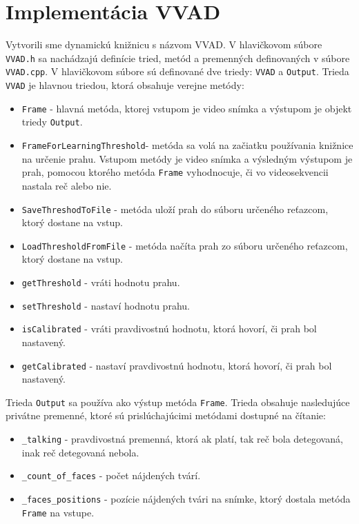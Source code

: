 \section{Implementácia VVAD}
Vytvorili sme dynamickú knižnicu s názvom VVAD. 
V hlavičkovom súbore \texttt{VVAD.h} sa nachádzajú definície tried, metód a premenných definovaných v súbore \texttt{VVAD.cpp}.
V hlavičkovom súbore sú definované dve triedy: \texttt{VVAD} a  \texttt{Output}.
Trieda \texttt{VVAD} je hlavnou triedou, ktorá obsahuje verejne metódy:
\begin{itemize}
\item \texttt{Frame} - hlavná metóda, ktorej vstupom je video snímka a výstupom je objekt triedy \texttt{Output}.
\item \texttt{Frame\-For\-Learning\-Threshold}- metóda sa volá na začiatku používania knižnice na určenie prahu. Vstupom metódy je video snímka a výsledným výstupom je prah, pomocou ktorého metóda \texttt{Frame} vyhodnocuje, či vo videosekvencii nastala reč alebo nie.
\item \texttt{SaveThreshodToFile} - metóda uloží prah do súboru určeného reťazcom, ktorý dostane na vstup.
\item \texttt{LoadThresholdFromFile} -  metóda načíta prah zo súboru určeného reťazcom, ktorý dostane na vstup.
\item \texttt{getThreshold} - vráti hodnotu prahu.
\item \texttt{setThreshold} - nastaví hodnotu prahu.
\item \texttt{isCalibrated} - vráti pravdivostnú hodnotu, ktorá hovorí, či prah bol nastavený.
\item \texttt{getCalibrated} - nastaví pravdivostnú hodnotu, ktorá hovorí, či prah bol nastavený.
\end{itemize}

Trieda  \texttt{Output} sa používa ako výstup metóda  \texttt{Frame}. Trieda obsahuje nasledujúce privátne premenné, ktoré sú prislúchajúcimi metódami dostupné na čítanie:
\begin{itemize}
\item \texttt{\_talking} - pravdivostná premenná, ktorá ak platí, tak reč bola detegovaná, inak reč detegovaná nebola.
\item \texttt{\_count\_of\_faces} - počet nájdených tvárí.
\item \texttt{\_faces\_positions} - pozície nájdených tvári na snímke, ktorý dostala metóda \texttt{Frame} na vstupe.
\end{itemize}

